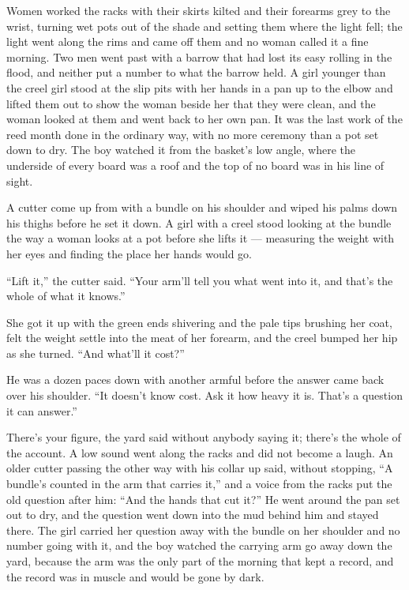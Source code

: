 Women worked the racks with their skirts kilted and their forearms grey to the wrist, turning wet pots out of the shade and setting them where the light fell; the light went along the rims and came off them and no woman called it a fine morning. Two men went past with a barrow that had lost its easy rolling in the flood, and neither put a number to what the barrow held. A girl younger than the creel girl stood at the slip pits with her hands in a pan up to the elbow and lifted them out to show the woman beside her that they were clean, and the woman looked at them and went back to her own pan. It was the last work of the reed month done in the ordinary way, with no more ceremony than a pot set down to dry. The boy watched it from the basket's low angle, where the underside of every board was a roof and the top of no board was in his line of sight.

A cutter come up from  with a bundle on his shoulder and wiped his palms down his thighs before he set it down. A girl with a creel stood looking at the bundle the way a woman looks at a pot before she lifts it --- measuring the weight with her eyes and finding the place her hands would go.

“Lift it,” the cutter said. “Your arm'll tell you what went into it, and that's the whole of what it knows.”

She got it up with the green ends shivering and the pale tips brushing her coat, felt the weight settle into the meat of her forearm, and the creel bumped her hip as she turned. “And what'll it cost?”

He was a dozen paces down with another armful before the answer came back over his shoulder. “It doesn't know cost. Ask it how heavy it is. That's a question it can answer.”

There's your figure, the yard said without anybody saying it; there's the whole of the account. A low sound went along the racks and did not become a laugh. An older cutter passing the other way with his collar up said, without stopping, “A bundle's counted in the arm that carries it,” and a voice from the racks put the old question after him: “And the hands that cut it?” He went around the pan set out to dry, and the question went down into the mud behind him and stayed there. The girl carried her question away with the bundle on her shoulder and no number going with it, and the boy watched the carrying arm go away down the yard, because the arm was the only part of the morning that kept a record, and the record was in muscle and would be gone by dark.

